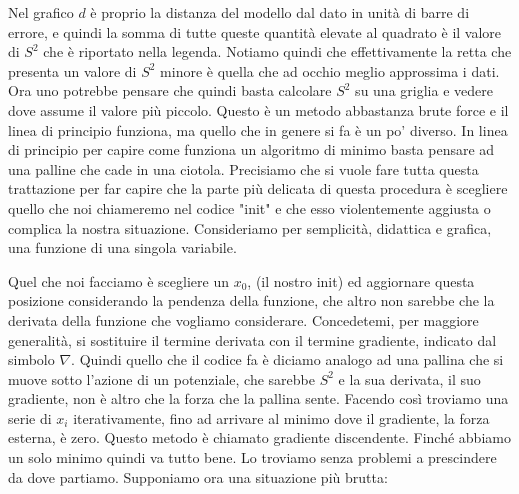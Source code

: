 \documentclass[10pt,a4paper]{article}
\begin{document}
\FloatBarrier
Nel grafico $d$ è proprio la distanza del modello dal dato in unità di barre di errore, e quindi la somma di tutte queste quantità elevate al quadrato è il valore di $S^2$ che è riportato nella legenda. Notiamo quindi che effettivamente la retta che presenta un valore di $S^2$ minore è quella che ad occhio meglio approssima i dati. Ora uno potrebbe pensare che quindi basta calcolare $S^2$ su una griglia e vedere dove assume il valore più piccolo. Questo è un metodo abbastanza brute force e il linea di principio funziona, ma quello che in genere si fa è un po' diverso. In linea di principio per capire come funziona un algoritmo di minimo basta pensare ad una palline che cade in una ciotola. Precisiamo che si vuole fare tutta questa trattazione per far capire che la parte più delicata di questa procedura è scegliere quello che noi chiameremo nel codice "init" e che esso violentemente aggiusta o complica la nostra situazione. Consideriamo per semplicità, didattica e grafica, una funzione di una singola variabile.
\begin{center}
\end{center}
Quel che noi facciamo è scegliere un $x_0$, (il nostro init) ed aggiornare questa posizione considerando la pendenza della funzione, che altro non sarebbe che la derivata della funzione che vogliamo considerare. Concedetemi, per maggiore generalità, si sostituire il termine derivata con il termine gradiente, indicato dal simbolo $\nabla$. Quindi quello che il codice fa è diciamo analogo ad una pallina che si muove sotto l'azione di un potenziale, che sarebbe $S^2$ e la sua derivata, il suo gradiente, non è altro che la forza che la pallina sente. Facendo così troviamo una serie di $x_i$ iterativamente, fino ad arrivare al minimo dove il gradiente, la forza esterna, è zero. Questo metodo è chiamato gradiente discendente. Finché abbiamo un solo minimo quindi va tutto bene. Lo troviamo senza problemi a prescindere da dove partiamo. Supponiamo ora una situazione più brutta:
\end{document}
